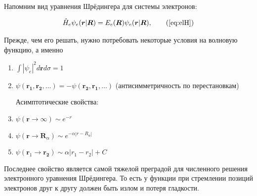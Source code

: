 \documentclass[12pt, oneside]{article}
\numberwithin{equation}{section}  %
\begin{document}
Напомним вид уравнения Шрёдингера для системы электронов:

\[
\hat{H}_e \psi_e (\bm{r}| \bm{R} ) = E_e (\bm{R}) \psi_e (\bm{r}| \bm{R}), \tag{\ref{eq:elH}}
\]

Прежде, чем его решать, нужно потребовать некоторые условия на волновую функцию, а именно

\begin{enumerate}[label=\arabic*)]
\item \(\int |\psi_e|^2 d\bm{r}d\sigma = 1\)
\item \(\psi(\bm{r_1}, \bm{r_2}, \dots) = - \psi(\bm{r_2}, \bm{r_1}, \dots)\) (антисимметричность по перестановкам)

Асимптотические свойства:


    

\item \(\psi(\bm{r} \rightarrow \infty) \sim e ^{-r}\)
\item \(\psi(\bm{r} \rightarrow \bm{R}_\alpha) \sim e ^{- \alpha |r - R_\alpha|}\)
\item \(\psi(\bm{r}_1 \rightarrow \bm{r_2}) \sim \alpha |r_1 - r_2| + C\)
\end{enumerate}

Последнее свойство является самой тяжелой преградой для численного решения электронного уравнения Шрёдингера. То есть у функции при стремлении позиций электронов друг к другу должен быть излом и потеря гладкости.
\end{document}

